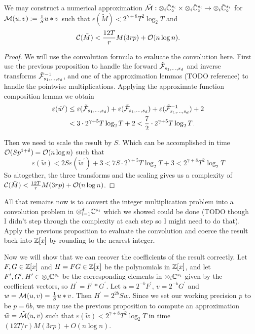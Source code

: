 \begin{proposition}
    We may construct a numerical approximation $\tilde{\mathcal M}: \otimes_i \tilde{{\mathbb C}}_\circ^{s_i} \times \otimes_i \tilde{{\mathbb C}}_\circ^{s_i} \to \otimes_i \tilde{{\mathbb C}}_\circ^{s_i}$ for $\mathcal M(u, v) := \frac{1}{S}u \ast v$ such that $\epsilon(\tilde{M}) < 2^{\gamma + 8}T^2 \log_2T$ and
    \[
        \mathcal C(\tilde{M}) < \frac{12T}{r} M(3rp) + \mathcal O(n \log n).
    \]
\end{proposition}

\begin{proof}
    We will use the convolution formula to evaluate the convolution here. First use the previous proposition to handle the forward $\tilde{\mathcal F}_{s_1, \ldots, s_d}$ and inverse transforms $\tilde{\mathcal F}_{s_1, \ldots, s_d}^{-1}$, and one of the approximation lemmas (TODO reference) to handle the pointwise multiplications. Applying the approximate function composition lemma we obtain
    \begin{align*}
        \varepsilon(\tilde{w}^\prime) &\leq \varepsilon(\tilde{\mathcal F}_{s_1, \ldots, s_d}) + \varepsilon(\tilde{\mathcal F}_{s_1, \ldots, s_d}) + \varepsilon(\tilde{\mathcal F}^{-1}_{s_1, \ldots, s_d}) + 2\\
                                      &< 3 \cdot 2^{\gamma + 5}T\log_2 T + 2 < \frac{7}{2} \cdot 2^{\gamma + 5}T \log_2 T.
    \end{align*}

    Then we need to scale the result by $S$. Which can be accomplished in time $\mathcal O(Sp^{1 + \delta}) = \mathcal O(n \log n)$ such that
    \[
        \varepsilon(\tilde{w}) < 2S\varepsilon(\tilde{w}^\prime) + 3 < 7S \cdot 2^{\gamma + 5} T \log_2 T + 3 < 2^{\gamma + 8}T^2 \log_2 T
    \]
    So altogether, the three transforms and the scaling gives us a complexity of $\mathcal C(\tilde{M}) < \frac{12T}{r} M(3rp) + \mathcal O(n \log n)$.
\end{proof}

All that remains now is to convert the integer multiplication problem into a convolution problem in $\otimes_{i=1}^d {\mathbb C}^{s_i}$ which we showed could be done (TODO though I didn't step through the complexity at each step so I might need to do that). Apply the previous proposition to evaluate the convolution and coerce the result back into ${\mathbb Z}[x]$ by rounding to the nearest integer.

Now we will show that we can recover the coefficients of the result correctly.
Let $F, G \in {\mathbb Z}[x]$ and $H = FG \in {\mathbb Z}[x]$ be the polynomials in ${\mathbb Z}[x]$, and let $F^\prime, G^\prime, H^\prime \in \otimes_i {\mathbb C}^{s_i}$ be the corresponding elements in $\otimes_i {\mathbb C}^{s_i}$ given by the coefficient vectors, so $H^\prime = F^\prime \ast G^\prime$. Let $u = 2^{-b}F^\prime$, $v = 2^{-b} G^\prime$ and $w = \mathcal M(u, v) = \frac{1}{S} u \ast v$. Then $H^\prime = 2^{2b}Sw$. Since we set our working precision $p$ to be $p = 6b$, we may use the previous proposition to compute an approximation $\tilde{w} = \tilde{\mathcal M}(u, v)$ such that $\varepsilon(\tilde{w}) < 2^{\gamma + 8} T^2 \log_2 T$ in time $(12T/r)M(3rp) + O(n \log n)$.

